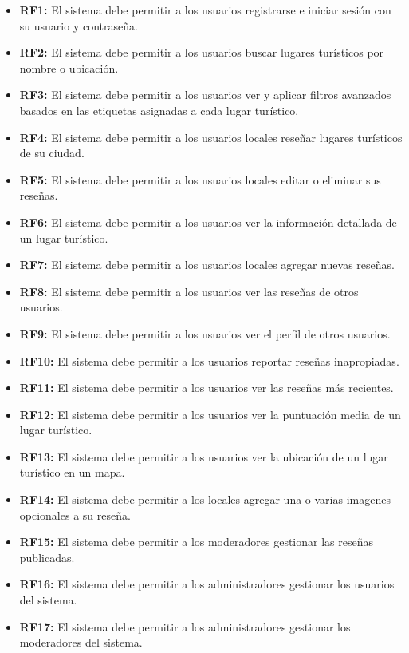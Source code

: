 \begin{itemize}    
    \item \textbf{RF1:} El sistema debe permitir a los usuarios registrarse e iniciar sesión con su usuario y contraseña.
    \item \textbf{RF2:} El sistema debe permitir a los usuarios buscar lugares turísticos por nombre o ubicación.
    \item \textbf{RF3:} El sistema debe permitir a los usuarios ver y aplicar filtros avanzados basados en las etiquetas asignadas a cada lugar turístico.
    \item \textbf{RF4:} El sistema debe permitir a los usuarios locales reseñar lugares turísticos de su ciudad.
    \item \textbf{RF5:} El sistema debe permitir a los usuarios locales editar o eliminar sus reseñas.
    \item \textbf{RF6:} El sistema debe permitir a los usuarios ver la información detallada de un lugar turístico.
    \item \textbf{RF7:} El sistema debe permitir a los usuarios locales agregar nuevas reseñas.
    \item \textbf{RF8:} El sistema debe permitir a los usuarios ver las reseñas de otros usuarios.
    \item \textbf{RF9:} El sistema debe permitir a los usuarios ver el perfil de otros usuarios.
    \item \textbf{RF10:} El sistema debe permitir a los usuarios reportar reseñas inapropiadas.
    \item \textbf{RF11:} El sistema debe permitir a los usuarios ver las reseñas más recientes.
    \item \textbf{RF12:} El sistema debe permitir a los usuarios ver la puntuación media de un lugar turístico.
    \item \textbf{RF13:} El sistema debe permitir a los usuarios ver la ubicación de un lugar turístico en un mapa.
    \item \textbf{RF14:} El sistema debe permitir a los locales agregar una o varias imagenes opcionales a su reseña.
    \item \textbf{RF15:} El sistema debe permitir a los moderadores gestionar las reseñas publicadas.
    \item \textbf{RF16:} El sistema debe permitir a los administradores gestionar los usuarios del sistema.
    \item \textbf{RF17:} El sistema debe permitir a los administradores gestionar los moderadores del sistema.
\end{itemize}